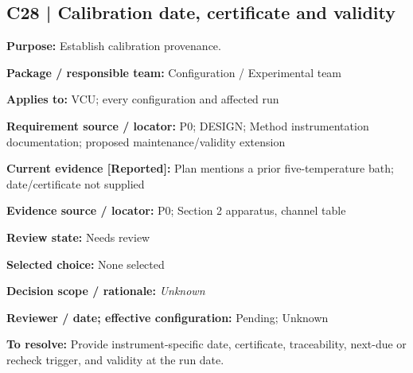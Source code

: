 \documentclass[11pt]{article}
\begin{document}
\begin{minipage}{\textwidth}\small\setlength{\parskip}{2pt}
\subsection*{C28 | Calibration date, certificate and validity}
\textbf{Purpose:} Establish calibration provenance.\par
\textbf{Package / responsible team:} Configuration / Experimental team\par
\textbf{Applies to:} VCU; every configuration and affected run\par
\textbf{Requirement source / locator:} P0; DESIGN; Method instrumentation documentation; proposed maintenance/validity extension\par
\textbf{Current evidence [Reported]:} Plan mentions a prior five-temperature bath; date/certificate not supplied\par
\textbf{Evidence source / locator:} P0; Section 2 apparatus, channel table\par
\textbf{Review state:} Needs review\par
\textbf{Selected choice:} None selected\par
\textbf{Decision scope / rationale:} \textit{Unknown}\par
\textbf{Reviewer / date; effective configuration:} Pending; Unknown\par
\textbf{To resolve:} Provide instrument-specific date, certificate, traceability, next-due or recheck trigger, and validity at the run date.\par
\end{minipage}\par\vspace{5pt}
\end{document}
